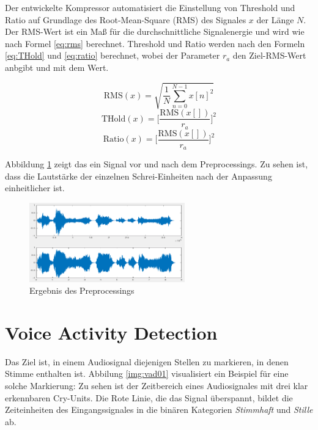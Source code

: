 Der entwickelte Kompressor automatisiert die Einstellung von Threshold und Ratio auf Grundlage des Root-Mean-Square (RMS) des Signales $x$ der Länge $N$. Der RMS-Wert ist ein Maß für die durchschnittliche Signalenergie und wird wie nach Formel \ref{eq:rms} berechnet. Threshold und Ratio werden nach den Formeln \ref{eq:THold} und \ref{eq:ratio} berechnet, wobei der Parameter $r_a$ den Ziel-RMS-Wert anbgibt und mit dem Wert.

\begin{equation}
\text{RMS}(x) = \sqrt{\frac{1}{N}\sum_{n=0}^{N-1}x[n]^2}
\label{eq:rms}
\end{equation}
\begin{equation}
\text{THold}(x) = \bigg[\frac{\text{RMS}(x[])}{r_a}\bigg]^{2}
\label{eq:THold}
\end{equation}
\begin{equation}
\text{Ratio}(x) = \bigg[\frac{\text{RMS}(x[])}{r_a}\bigg]^{2}
\label{eq:ratio}
\end{equation}

Abbildung \ref{img:compressing01} zeigt das ein Signal vor und nach dem Preprocessings. Zu sehen ist, dass die Lautstärke der einzelnen Schrei-Einheiten nach der Anpassung einheitlicher ist. 

\begin{figure}[h]
	\centering
	\includegraphics[width=0.6\textwidth]{bilder/compressing01.png}
	\caption{Ergebnis des Preprocessings}
	\label{img:compressing01}
\end{figure}

\section{Voice Activity Detection}
\label{sec:vad}

Das Ziel ist, in einem Audiosignal diejenigen Stellen zu markieren, in denen Stimme enthalten ist. Abbilung \ref{img:vad01} visualisiert ein Beispiel für eine solche Markierung: Zu sehen ist der Zeitbereich eines Audiosignales mit drei klar erkennbaren Cry-Units. Die Rote Linie, die das Signal überspannt, bildet die Zeiteinheiten des Eingangssignales in die binären Kategorien \emph{Stimmhaft} und \emph{Stille} ab.

